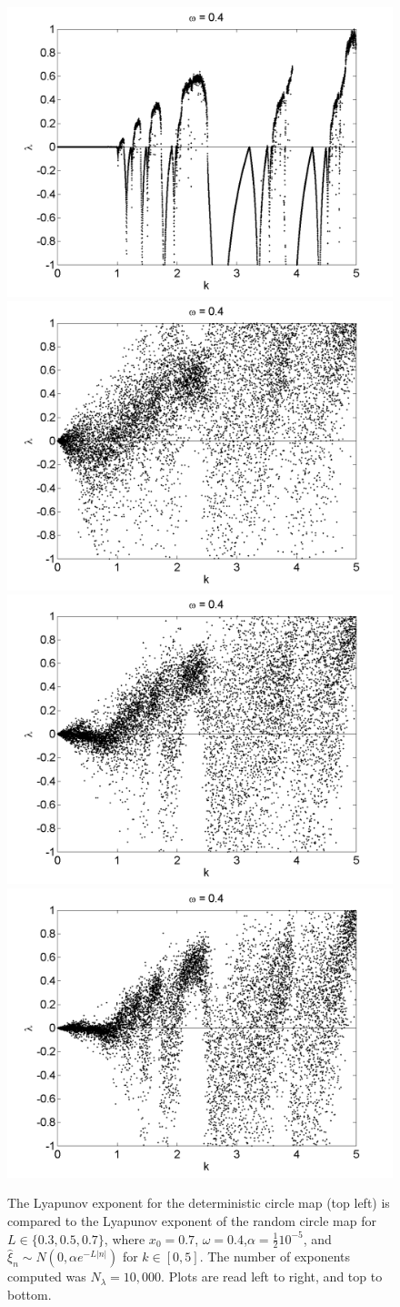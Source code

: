 \begin{figure}[!h]
\caption[Lyapunov exponent in the random circle map (normal distribution) compared to the
deterministic map, varying $k$, $\alpha = \frac{1}{2}10^{-5}$]{The Lyapunov exponent for the deterministic
  circle map (top left) is compared
  to the Lyapunov exponent of the random circle map for $L \in
  \{0.3,0.5,0.7\}$, where $x_0=0.7$, $\omega=0.4$,$\alpha =\frac{1}{2}10^{-5}$, and $\hat{\xi}_n\sim
  N(0,\alpha e^{-L|n|})$ for $k \in [0,5]$. The number of exponents computed was $N_\lambda=10,000$. Plots are read left to right, and top to bottom. }\label{fig:rcirclyap2_n}
\centering
\includegraphics[width=.5\textwidth]{figs/detcirc_n_lyap_10000_w_04_k.png}\hfill
\includegraphics[width=.5\textwidth]{figs/rcirc_n_lyap_halfa10000_L_03_w_04_k.png}\\
\includegraphics[width=.5\textwidth]{figs/rcirc_n_lyap_halfa10000_L_05_w_04_k.png}\hfill
\includegraphics[width=.5\textwidth]{figs/rcirc_n_lyap_halfa10000_L_07_w_04_k.png}\\
\end{figure}

